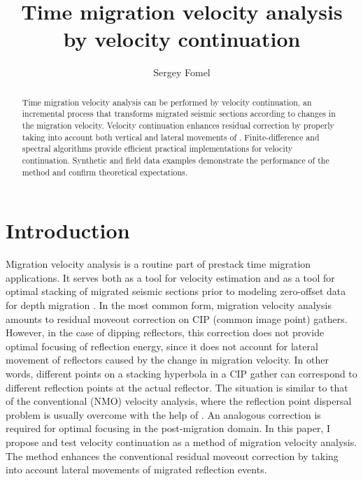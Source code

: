 
\title{Time migration velocity analysis by velocity continuation}

\author{Sergey Fomel}
\maketitle

\begin{abstract}
Time migration velocity analysis can be performed by velocity
  continuation, an incremental process that transforms
  migrated seismic sections according to changes in the migration velocity.
  Velocity continuation enhances residual  correction by
  properly taking into account both vertical and lateral movements of
  . Finite-difference and spectral algorithms
  provide efficient practical implementations for velocity continuation.
  Synthetic and field data examples demonstrate the performance of the method
  and confirm theoretical expectations.
\end{abstract}

\section{Introduction}
Migration velocity analysis is a routine part of prestack time
migration applications. It serves both as a tool for velocity
estimation \cite[]{FBR08-06-02240234} and as a tool for optimal
stacking of migrated seismic sections prior to modeling zero-offset
data for depth migration \cite[]{GEO62-02-05680576}. In the most
common form, migration velocity analysis amounts to residual moveout
correction on CIP (common image point) gathers. However, in the case
of dipping reflectors, this correction does not provide optimal
focusing of reflection energy, since it does not account for lateral
movement of reflectors caused by the change in migration velocity. In
other words, different points on a stacking hyperbola in a CIP gather
can correspond to different reflection points at the actual reflector.
The situation is similar to that of the conventional  (NMO) velocity analysis, where the reflection point
dispersal problem is usually overcome with the help of  \cite[]{FBR04-07-00070024,dmo}. An analogous correction is
required for optimal focusing in the post-migration domain. In this
paper, I propose and test velocity continuation as a method of
migration velocity analysis. The method enhances the conventional
residual moveout correction by taking into account lateral movements
of migrated reflection events.

